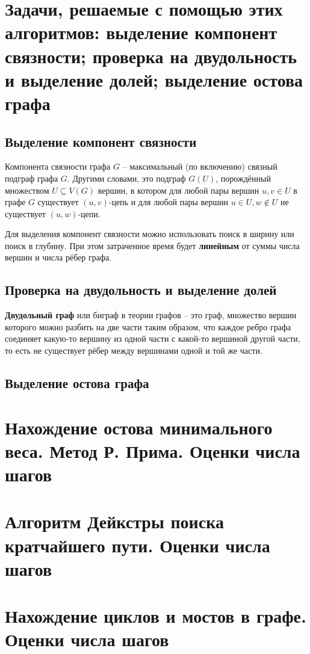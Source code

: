 \documentclass[40pt]{article}
\begin{document}
\section{Задачи, решаемые с помощью этих алгоритмов: выделение компонент связности; проверка на двудольность и выделение долей; выделение остова графа}

\subsection{Выделение компонент связности}

Компонента связности графа $G$ -- максимальный (по включению) связный подграф графа $G$. Другими словами, это подграф $G(U)$, порождённый множеством $U \subseteq V(G)$ вершин, в котором для любой пары вершин $u, v \in U$ в графе $G$ существует $(u, v)$-цепь и для любой пары вершин $u \in U, w \notin U$ не существует $(u, w)$-цепи.

Для выделения компонент связности можно использовать поиск в ширину или поиск в глубину. При этом затраченное время будет \textbf{линейным} от суммы числа вершин и числа рёбер графа.

\subsection{Проверка на двудольность и выделение долей}

\textbf{Двудольный граф} или биграф в теории графов -- это граф, множество вершин которого можно разбить на две части таким образом, что каждое ребро графа соединяет какую-то вершину из одной части с какой-то вершиной другой части, то есть не существует рёбер между вершинами одной и той же части.

\subsection{Выделение остова графа}



\section{Нахождение остова минимального веса. Метод Р. Прима. Оценки числа шагов}
\section{Алгоритм Дейкстры поиска кратчайшего пути. Оценки числа шагов}
\section{Нахождение циклов и мостов в графе.  Оценки числа шагов}
\end{document}
